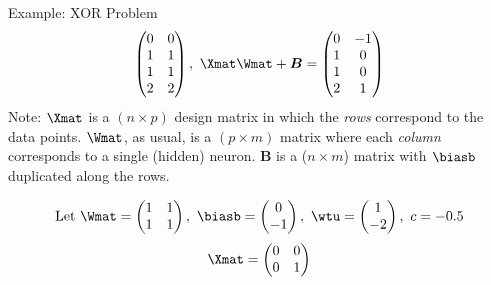 \begin{vbframe}{Example: XOR Problem}
\begin{eqnarray*}
\begin{pmatrix}
      0 & 0 \\
      1 & 1 \\
      1 & 1 \\
      2 & 2
    \end{pmatrix}, \
      \Xmat \Wmat + \bm{B} = \begin{pmatrix}
        0 & -1 \\
        1 & 0 \\
        1 & 0 \\
        2 & 1
    \end{pmatrix}
  \end{eqnarray*}
 \footnotesize{Note: $\Xmat$ is a $(n \times p)$ design matrix in which the \textit{rows} correspond to the data points. $\Wmat$, as usual, is a $(p \times m)$ matrix where each \textit{column} corresponds to a single (hidden) neuron. $\bm{B}$ is a ($n \times m$) matrix with $\biasb$ duplicated along the rows.}
 \begin{figure}
    \centering
  \end{figure}
 \framebreak
 \normalsize{
 \begin{eqnarray*}
   \text{Let} \ \Wmat = \begin{pmatrix}
      1 & 1 \\
      1 & 1
    \end{pmatrix}, \
      \biasb = \begin{pmatrix}
      0 \\
      -1
    \end{pmatrix}, \
      \wtu = \begin{pmatrix}
      1 \\
      -2
    \end{pmatrix}, \
      c = - 0.5
  \end{eqnarray*}
  \begin{eqnarray*}
  \Xmat = \begin{pmatrix}
      0 & 0 \\
      0 & 1 \\

\end{pmatrix}
\end{eqnarray*}}
\end{vbframe}
